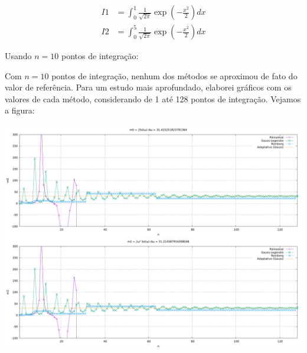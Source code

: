 \documentclass{homework}
\begin{document}
	\begin{align*}
		I1 &= \int_{0}^{1} \frac{1}{\sqrt{2 \pi}} \exp \left(-\frac{x^2}{2}\right) dx\\
		I2 &= \int_{0}^{5} \frac{1}{\sqrt{2 \pi}} \exp \left(-\frac{x^2}{2}\right) dx
	\end{align*}

	Usando $n = 10$ pontos de integração:

	
	
	\quest[Usando o seu programa e considerando $S_\sigma(\omega) = \text{RAO}(\omega)^2 S_\eta(\omega)$, onde%
	$$\text{RAO}(\omega) = \frac{1}{%
	\sqrt{%
		\left(1 - \left(\frac{\omega}{\omega_n}\right)^2\right)^2 + %
		\left(2 \xi \frac{\omega}{\omega_n}\right)^2%
		}%
	}$$%
	com $\omega_n = 1.0$ e $\xi = 0.05$ e $S_\eta(\omega) = 2.0$, obtenha $m_0$ e $m_2$ dados por:%
		$$ m_0 = \int_{0}^{10} S_\sigma(\omega)~d\omega$$%
		$$ m_2 = \int_{0}^{10} \omega^2 S_\sigma(\omega)~d\omega $$%
	]
	
	
	
	Com $n = 10$ pontos de integração, nenhum dos métodos se aproximou de fato do valor de referência. Para um estudo mais aprofundado, elaborei gráficos com os valores de cada método, considerando de 1 até 128 pontos de integração. Vejamos a figura:
	
	\begin{fig}
		\includegraphics[width=\textwidth]{../src/plot/L5-Q3.pdf}
	\end{fig}
	
\end{document}

